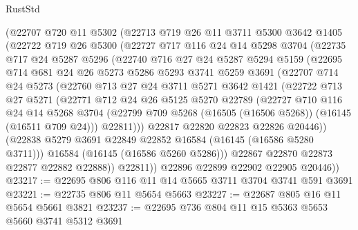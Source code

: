 \begin{lexlean}{RustStd}
\begin{coremodule}
    (@22707
      @720
      @11
      @5302
      (@22713
        @719
        @26
        @11
        @3711
        @5300
        @3642
        @1405
        (@22722
          @719
          @26
          @5300
          (@22727
            @717
            @116
            @24
            @14
            @5298
            @3704
            (@22735
              @717
              @24
              @5287
              @5296
              (@22740
                @716
                @27
                @24
                @5287
                @5294
                @5159
                (@22695
                  @714
                  @681
                  @24
                  @26
                  @5273
                  @5286
                  @5293
                  @3741
                  @5259
                  @3691
                  (@22707
                    @714
                    @24
                    @5273
                    (@22760
                      @713
                      @27
                      @24
                      @3711
                      @5271
                      @3642
                      @1421
                      (@22722
                        @713
                        @27
                        @5271
                        (@22771
                          @712
                          @24
                          @26
                          @5125
                          @5270
                          @22789
                          (@22727
                            @710
                            @116
                            @24
                            @14
                            @5268
                            @3704
                            (@22799 @709 @5268 (@16505 (@16506 @5268)) (@16145 (@16511 @709 @24)))
                            @22811)))
                      @22817
                      @22820
                      @22823
                      @22826
                      @20446))
                  (@22838 @5279 @3691 @22849 @22852 @16584 (@16145 (@16586 @5280 @3711)))
                  @16584
                  (@16145 (@16586 @5260 @5286)))
                @22867
                @22870
                @22873
                @22877
                @22882
                @22888))
            @22811))
        @22896
        @22899
        @22902
        @22905
        @20446))
@23217 := @22695 @806 @116 @11 @14 @5665 @3711 @3704 @3741 @591 @3691
@23221 := @22735 @806 @11 @5654 @5663
@23227 := @22687 @805 @16 @11 @5654 @5661 @3821
@23237 := @22695 @736 @804 @11 @15 @5363 @5653 @5660 @3741 @5312 @3691

\end{coremodule}
\end{lexlean}
